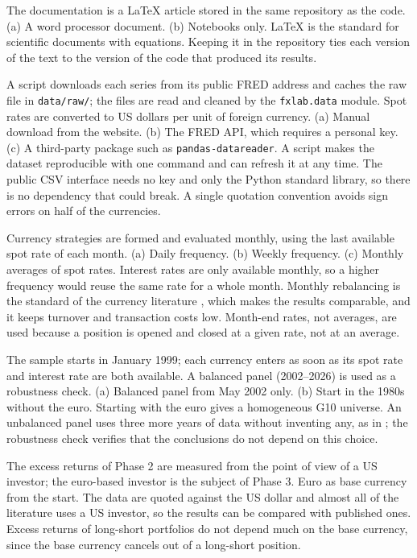 {The documentation is a \LaTeX{} article stored in the same repository as the code.}
{(a) A word processor document. (b) Notebooks only.}
{\LaTeX{} is the standard for scientific documents with equations. Keeping it in the repository ties each version of the text to the version of the code that produced its results.}

{A script downloads each series from its public FRED address and caches the raw file in \texttt{data/raw/}; the files are read and cleaned by the \texttt{fxlab.data} module. Spot rates are converted to US dollars per unit of foreign currency.}
{(a) Manual download from the website. (b) The FRED API, which requires a personal key. (c) A third-party package such as \texttt{pandas-datareader}.}
{A script makes the dataset reproducible with one command and can refresh it at any time. The public CSV interface needs no key and only the Python standard library, so there is no dependency that could break. A single quotation convention avoids sign errors on half of the currencies.}

{Currency strategies are formed and evaluated monthly, using the last available spot rate of each month.}
{(a) Daily frequency. (b) Weekly frequency. (c) Monthly averages of spot rates.}
{Interest rates are only available monthly, so a higher frequency would reuse the same rate for a whole month. Monthly rebalancing is the standard of the currency literature \citep{lustig2011,menkhoff2012carry}, which makes the results comparable, and it keeps turnover and transaction costs low. Month-end rates, not averages, are used because a position is opened and closed at a given rate, not at an average.}

{The sample starts in January 1999; each currency enters as soon as its spot rate and interest rate are both available. A balanced panel (2002--2026) is used as a robustness check.}
{(a) Balanced panel from May 2002 only. (b) Start in the 1980s without the euro.}
{Starting with the euro gives a homogeneous G10 universe. An unbalanced panel uses three more years of data without inventing any, as in \citet{lustig2011}; the robustness check verifies that the conclusions do not depend on this choice.}

{The excess returns of Phase 2 are measured from the point of view of a US investor; the euro-based investor is the subject of Phase 3.}
{Euro as base currency from the start.}
{The data are quoted against the US dollar and almost all of the literature uses a US investor, so the results can be compared with published ones. Excess returns of long-short portfolios do not depend much on the base currency, since the base currency cancels out of a long-short position.}

